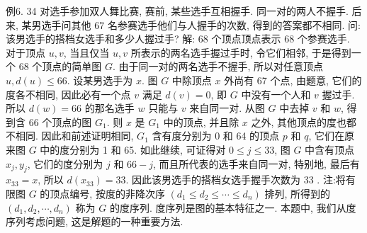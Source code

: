 例6. 34 对选手参加双人舞比赛, 赛前, 某些选手互相握手.
同一对的两人不握手.
后来, 某男选手问其他 67 名参赛选手他们与人握手的次数, 得到的答案都不相同.
问: 该男选手的搭档女选手和多少人握过手?
解: 68 个顶点顶点表示 68 个参赛选手.
对于顶点 $u, v$, 当且仅当 $u, v$ 所表示的两名选手握过手时, 令它们相邻, 于是得到一个 68 个顶点的简单图 $G$.
由于同一对的两名选手不握手, 所以对任意顶点 $u, d(u) \leqslant 66$.
设某男选手为 $x$. 图 $G$ 中除顶点 $x$ 外尚有 67 个点, 由题意, 它们的度各不相同, 因此必有一个点 $v$ 满足 $d(v)=0$, 即 $G$ 中没有一个人和 $v$ 握过手.
所以 $d(w)=66$ 的那名选手 $w$ 只能与 $v$ 来自同一对.
从图 $G$ 中去掉 $v$ 和 $w$, 得到含 66 个顶点的图 $G_1$. 则 $x$ 是 $G_1$ 中的顶点, 并且除 $x$ 之外, 其他顶点的度也都不相同.
因此和前述证明相同, $G_1$ 含有度分别为 0 和 64 的顶点 $p$ 和 $q$, 它们在原来图 $G$ 中的度分别为 1 和 65. 如此继续,
可证得对 $0 \leqslant j \leqslant 33$, 图 $G$ 中含有顶点 $x_j, y_j$, 它们的度分别为 $j$ 和 $66-j$, 而且所代表的选手来自同一对, 特别地, 最后有 $x_{33}=x$, 所以 $d\left(x_{33}\right)=33$. 因此该男选手的搭档女选手握手次数为 33 .
注:将有限图 $G$ 的顶点编号, 按度的非降次序 $\left(d_1 \leqslant d_2 \leqslant \cdots \leqslant d_n\right)$ 排列, 所得到的 $\left(d_1, d_2, \cdots, d_n\right)$ 称为 $G$ 的度序列.
度序列是图的基本特征之一.
本题中, 我们从度序列考虑问题, 这是解题的一种重要方法.



